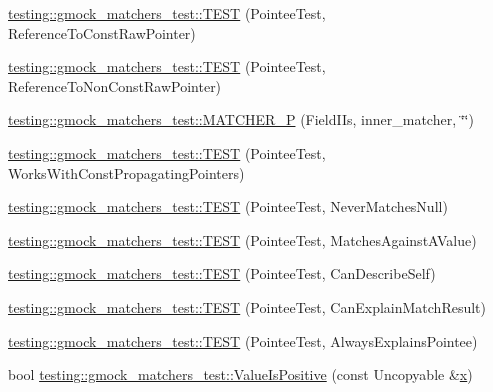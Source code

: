 \begin{DoxyCompactItemize}
\item 
\mbox{\hyperlink{namespacetesting_1_1gmock__matchers__test_aebba40e49fe790490ba88984fdc7c7a6}{testing\+::gmock\+\_\+matchers\+\_\+test\+::\+T\+E\+ST}} (Pointee\+Test, Reference\+To\+Const\+Raw\+Pointer)
\item 
\mbox{\hyperlink{namespacetesting_1_1gmock__matchers__test_a2d2296f6b23130be225b8df48746dfd5}{testing\+::gmock\+\_\+matchers\+\_\+test\+::\+T\+E\+ST}} (Pointee\+Test, Reference\+To\+Non\+Const\+Raw\+Pointer)
\item 
\mbox{\hyperlink{namespacetesting_1_1gmock__matchers__test_a3d3f285bba1766bf9daf840a16e79924}{testing\+::gmock\+\_\+matchers\+\_\+test\+::\+M\+A\+T\+C\+H\+E\+R\+\_\+P}} (Field\+I\+Is, inner\+\_\+matcher, \char`\"{}\char`\"{})
\item 
\mbox{\hyperlink{namespacetesting_1_1gmock__matchers__test_a9d851a5bb597fa45b5d1cf3f295398e8}{testing\+::gmock\+\_\+matchers\+\_\+test\+::\+T\+E\+ST}} (Pointee\+Test, Works\+With\+Const\+Propagating\+Pointers)
\item 
\mbox{\hyperlink{namespacetesting_1_1gmock__matchers__test_ac778a9cebf9306a5efd27cc1186d8269}{testing\+::gmock\+\_\+matchers\+\_\+test\+::\+T\+E\+ST}} (Pointee\+Test, Never\+Matches\+Null)
\item 
\mbox{\hyperlink{namespacetesting_1_1gmock__matchers__test_afe22e8230dc7a34498e4b2f91dcdd7cd}{testing\+::gmock\+\_\+matchers\+\_\+test\+::\+T\+E\+ST}} (Pointee\+Test, Matches\+Against\+A\+Value)
\item 
\mbox{\hyperlink{namespacetesting_1_1gmock__matchers__test_ac8b9baa938635d587f0b0df1073208e2}{testing\+::gmock\+\_\+matchers\+\_\+test\+::\+T\+E\+ST}} (Pointee\+Test, Can\+Describe\+Self)
\item 
\mbox{\hyperlink{namespacetesting_1_1gmock__matchers__test_a263ede06f6b32a625bb40e4f4c58c8dc}{testing\+::gmock\+\_\+matchers\+\_\+test\+::\+T\+E\+ST}} (Pointee\+Test, Can\+Explain\+Match\+Result)
\item 
\mbox{\hyperlink{namespacetesting_1_1gmock__matchers__test_a00128de027ff6f49f82a7011dd346d43}{testing\+::gmock\+\_\+matchers\+\_\+test\+::\+T\+E\+ST}} (Pointee\+Test, Always\+Explains\+Pointee)
\item 
bool \mbox{\hyperlink{namespacetesting_1_1gmock__matchers__test_a7c429b4fa8a7835724d9e28033e908b2}{testing\+::gmock\+\_\+matchers\+\_\+test\+::\+Value\+Is\+Positive}} (const Uncopyable \&\mbox{\hyperlink{_obj__test_2lib_2googletest-master_2googlemock_2test_2gmock-matchers__test_8cc_a6150e0515f7202e2fb518f7206ed97dc}{x}})

\end{DoxyCompactItemize}
